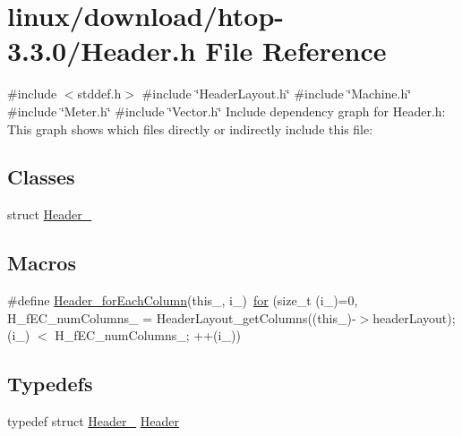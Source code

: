 \hypertarget{linux_2download_2htop-3_83_80_2Header_8h}{}\section{linux/download/htop-\/3.3.0/\+Header.h File Reference}
\label{linux_2download_2htop-3_83_80_2Header_8h}
{\ttfamily \#include $<$stddef.\+h$>$}\newline
{\ttfamily \#include \char`\"{}Header\+Layout.\+h\char`\"{}}\newline
{\ttfamily \#include \char`\"{}Machine.\+h\char`\"{}}\newline
{\ttfamily \#include \char`\"{}Meter.\+h\char`\"{}}\newline
{\ttfamily \#include \char`\"{}Vector.\+h\char`\"{}}\newline
Include dependency graph for Header.\+h\+:
This graph shows which files directly or indirectly include this file\+:
\subsection*{Classes}
\begin{DoxyCompactItemize}
\item 
struct \hyperlink{structHeader__}{Header\+\_\+}
\end{DoxyCompactItemize}
\subsection*{Macros}
\begin{DoxyCompactItemize}
\item 
\#define \hyperlink{linux_2download_2htop-3_83_80_2Header_8h_af27a88f94fb177b54dd3ff1f29b76615}{Header\+\_\+for\+Each\+Column}(this\+\_\+,  i\+\_\+)~\hyperlink{exo21_8cpp_a21d2815da7c583ec46e9b81638877e7b}{for} (size\+\_\+t (i\+\_\+)=0, H\+\_\+f\+E\+C\+\_\+num\+Columns\+\_\+ = Header\+Layout\+\_\+get\+Columns((this\+\_\+)-\/$>$header\+Layout); (i\+\_\+) $<$ H\+\_\+f\+E\+C\+\_\+num\+Columns\+\_\+; ++(i\+\_\+))
\end{DoxyCompactItemize}
\subsection*{Typedefs}
\begin{DoxyCompactItemize}
\item 
typedef struct \hyperlink{structHeader__}{Header\+\_\+} \hyperlink{linux_2download_2htop-3_83_80_2Header_8h_a7f4dfcf80c34406946a7bda3d88d5e36}{Header}
\end{DoxyCompactItemize}
